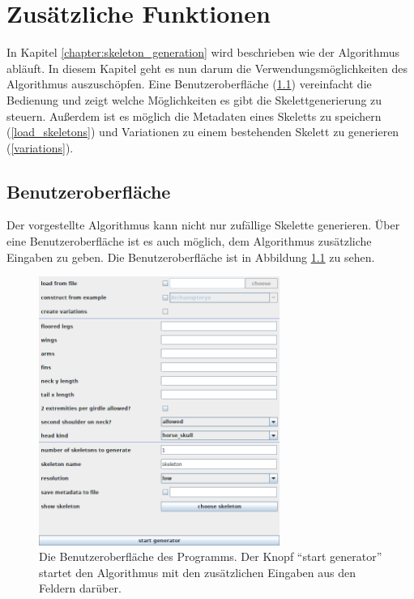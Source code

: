 \chapter{Zusätzliche Funktionen}
\label{chapter:additional_features}

In Kapitel \ref{chapter:skeleton_generation} wird beschrieben wie der Algorithmus abläuft. In diesem Kapitel geht es nun darum die Verwendungsmöglichkeiten des Algorithmus auszuschöpfen. Eine Benutzeroberfläche (\ref{gui}) vereinfacht die Bedienung und zeigt welche Möglichkeiten es gibt die Skelettgenerierung zu steuern. Außerdem ist es möglich die Metadaten eines Skeletts zu speichern (\ref{load_skeletons}) und Variationen zu einem bestehenden Skelett zu generieren (\ref{variations}).


\section{Benutzeroberfläche}
\label{gui}

Der vorgestellte Algorithmus kann nicht nur zufällige Skelette generieren. Über eine Benutzeroberfläche ist es auch möglich, dem Algorithmus zusätzliche Eingaben zu geben. Die Benutzeroberfläche ist in Abbildung \ref{gui_screenshot} zu sehen.

\begin{figure}
 \centering
 \includegraphics[width=0.7\textwidth]{graphics/gui.png}
 \caption{Die Benutzeroberfläche des Programms. Der Knopf "`start generator"' startet den Algorithmus mit den zusätzlichen Eingaben aus den Feldern darüber.}
 \label{gui_screenshot}
\end{figure}

